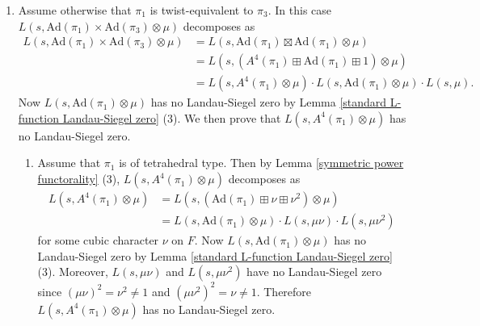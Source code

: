 \documentclass[12pt]{amsart}
\newcommand{\Ad}{\text{Ad}}
\begin{document}
\begin{enumerate}
\begin{enumerate}
\begin{enumerate}
            \begin{align*}
                L(s,A^4(\pi_1) \times \Ad(\pi_3) \otimes \mu) &= L(s,(\Ad(\pi_1) \boxplus \nu \boxplus \nu^2) \times \Ad(\pi_3) \otimes \mu) \\
                &= L(s,\Ad(\pi_3) \otimes \mu\nu) \cdot L(s,\Ad(\pi_3) \otimes \mu\nu^2) \\
                &\cdot L(s,\Ad(\pi_1) \times \Ad(\pi_3) \otimes \mu)
            \end{align*}
            to see that any Landau-Siegel zero of $L(s,\Ad(\pi_1) \times \Ad(\pi_3) \otimes \mu)$ would be a Landau-Siegel zero of $L(s)$ of order at least 12. Since $r \leq 10 < 12$, $L(s,\Ad(\pi_1) \times \Ad(\pi_3) \otimes \mu)$ has no Landau-Siegel zero.
        \end{enumerate}
        \item Assume otherwise that $\pi_1$ is twist-equivalent to $\pi_3$. In this case $L(s,\Ad(\pi_1) \times \Ad(\pi_3) \otimes \mu)$ decomposes as 
        \begin{align*}
            L(s,\Ad(\pi_1) \times \Ad(\pi_3) \otimes \mu) &= L(s,\Ad(\pi_1) \boxtimes \Ad(\pi_1) \otimes \mu) \\
            &= L(s,(A^4(\pi_1) \boxplus \Ad(\pi_1) \boxplus 1) \otimes \mu) \\
            &= L(s,A^4(\pi_1) \otimes \mu) \cdot L(s,\Ad(\pi_1) \otimes \mu) \cdot L(s,\mu).
        \end{align*}
        Now $L(s,\Ad(\pi_1) \otimes \mu)$ has no Landau-Siegel zero by Lemma \ref{standard L-function Landau-Siegel zero} (3). We then prove that 
        $L(s,A^4(\pi_1) \otimes \mu)$ has no Landau-Siegel zero.
        \begin{enumerate}
            \item Assume that $\pi_1$ is of tetrahedral type. Then by Lemma \ref{symmetric power functorality} (3), $L(s,A^4(\pi_1) \otimes \mu)$ decomposes as 
            \begin{align*}
                L(s,A^4(\pi_1) \otimes \mu) &= L(s,(\Ad(\pi_1) \boxplus \nu \boxplus \nu^2) \otimes \mu) \\
                &= L(s,\Ad(\pi_1) \otimes \mu) \cdot L(s,\mu\nu) \cdot L(s,\mu\nu^2)
            \end{align*}
            for some cubic character $\nu$ on $F$. Now $L(s,\Ad(\pi_1) \otimes \mu)$ has no Landau-Siegel zero by Lemma \ref{standard L-function Landau-Siegel zero} (3). Moreover, $L(s,\mu\nu)$ and $L(s,\mu\nu^2)$ have no Landau-Siegel zero since $(\mu\nu)^2 = \nu^2 \neq 1$ and $(\mu\nu^2)^2 = \nu \neq 1$. Therefore $L(s,A^4(\pi_1) \otimes \mu)$ has no Landau-Siegel zero.

\end{enumerate}
\end{enumerate}
\end{enumerate}
\end{document}
